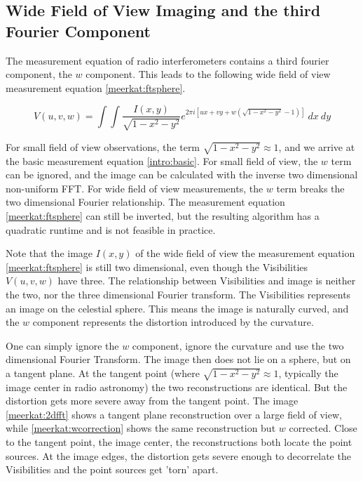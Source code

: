\subsection{Wide Field of View Imaging and the third Fourier Component} \label{meerkat:wof}
The measurement equation of radio interferometers contains a third fourier component, the $w$ component. This leads to the following wide field of view measurement equation \eqref{meerkat:ftsphere}.

\begin{equation}\label{meerkat:ftsphere}
V(u, v, w) = \int\int \frac{I(x, y)}{\sqrt{1 - x^2 - y ^2}} e^{2 \pi i [ux+vy+ w(\sqrt{1 - x^2 - y ^2} - 1)]} \: dx \: dy
\end{equation}

For small field of view observations, the term $\sqrt{1 - x^2 - y ^2} \approx 1$, and we arrive at the basic measurement equation \eqref{intro:basic}. For small field of view, the $w$ term can be ignored, and the image can be calculated with the inverse two dimensional non-uniform FFT. For wide field of view measurements, the $w$ term breaks the two dimensional Fourier relationship. The measurement equation \eqref{meerkat:ftsphere} can still be inverted, but the resulting algorithm has a quadratic runtime and is not feasible in practice.

Note that the image $I(x,y)$ of the wide field of view the measurement equation \eqref{meerkat:ftsphere} is still two dimensional, even though the Visibilities $V(u, v, w)$ have three. The relationship between Visibilities and image is neither the two, nor the three dimensional Fourier transform. The Visibilities represents an image on the celestial sphere. This means the image is naturally curved, and the $w$ component represents the distortion introduced by the curvature.

One can simply ignore the $w$ component, ignore the curvature and use the two dimensional Fourier Transform. The image then does not lie on a sphere, but on a tangent plane. At the tangent point (where $\sqrt{1 - x^2 - y ^2} \approx 1$, typically the image center in radio astronomy) the two reconstructions are identical. But the distortion gets more severe away from the tangent point. The image \ref{meerkat:2dfft} shows a tangent plane reconstruction over a large field of view, while \ref{meerkat:wcorrection} shows the same reconstruction but $w$ corrected. Close to the tangent point, the image center, the reconstructions both locate the point sources. At the image edges, the distortion gets severe enough to decorrelate the Visibilities and the point sources get 'torn' apart.

